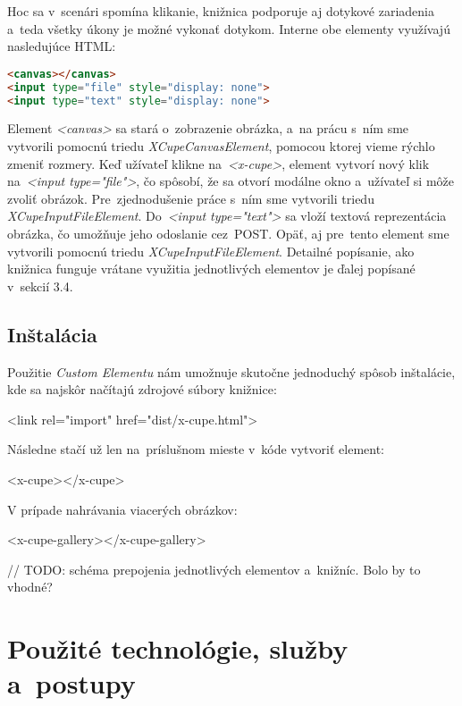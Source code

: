 Hoc sa v~scenári spomína klikanie, knižnica podporuje aj dotykové zariadenia a~teda všetky úkony je možné vykonať dotykom. Interne obe elementy využívajú nasledujúce HTML:

\begin{lstlisting}[language=HTML]
<canvas></canvas>
<input type="file" style="display: none">
<input type="text" style="display: none">
\end{lstlisting}

Element \emph{<canvas>} sa stará o~zobrazenie obrázka, a~na prácu s~ním sme vytvorili pomocnú triedu \emph{XCupeCanvasElement}, pomocou ktorej vieme rýchlo zmeniť rozmery. Keď užívateľ klikne na~\emph{<x-cupe>}, element vytvorí nový klik na~\emph{<input type="file"\textgreater}, čo spôsobí, že sa otvorí modálne okno a~užívateľ si môže zvoliť obrázok. Pre~zjednodušenie práce s~ním sme vytvorili triedu \emph{XCupeInputFileElement}. Do~\emph{<input type="text"\textgreater} sa vloží textová reprezentácia obrázka, čo umožňuje jeho odoslanie cez~POST. Opäť, aj pre~tento element sme vytvorili pomocnú triedu \emph{XCupeInputFileElement}. Detailné popísanie, ako knižnica funguje vrátane využitia jednotlivých elementov je ďalej popísané v~sekcií 3.4.

\subsection{Inštalácia}

Použitie \emph{Custom Elementu} nám umožnuje skutočne jednoduchý spôsob inštalácie, kde sa najskôr načítajú zdrojové súbory knižnice:
\begin{enumerate}
<link rel="import" href="dist/x-cupe.html">
\end{enumerate}

Následne stačí už len na~príslušnom mieste v~kóde vytvoriť element:
\begin{enumerate}
<x-cupe></x-cupe>
\end{enumerate}

V prípade nahrávania viacerých obrázkov:
\begin{enumerate}
<x-cupe-gallery></x-cupe-gallery>
\end{enumerate}

// TODO: schéma prepojenia jednotlivých elementov a~knižníc. Bolo by to vhodné?

\section{Použité technológie, služby a~postupy}
